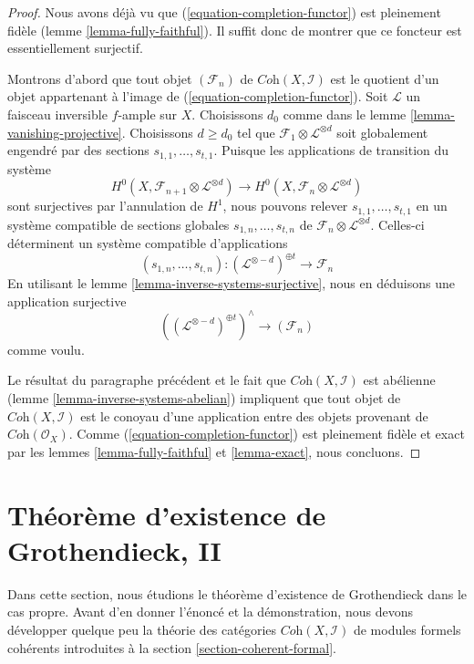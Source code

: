 \begin{proof}
Nous avons déjà vu que (\ref{equation-completion-functor}) est
pleinement fidèle (lemme \ref{lemma-fully-faithful}). Il suffit donc
de montrer que ce foncteur est essentiellement surjectif.

\medskip\noindent
Montrons d'abord que tout objet $(\mathcal{F}_n)$ de
$\textit{Coh}(X, \mathcal{I})$ est le quotient d'un objet
appartenant à l'image de (\ref{equation-completion-functor}).
Soit $\mathcal{L}$ un faisceau inversible $f$-ample sur $X$.
Choisissons $d_0$ comme dans le lemme \ref{lemma-vanishing-projective}.
Choisissons $d \geq d_0$ tel que
$\mathcal{F}_1 \otimes \mathcal{L}^{\otimes d}$
soit globalement engendré par des sections $s_{1, 1}, \ldots, s_{t, 1}$.
Puisque les applications de transition du système
$$
H^0(X, \mathcal{F}_{n + 1} \otimes \mathcal{L}^{\otimes d})
\longrightarrow
H^0(X, \mathcal{F}_n \otimes \mathcal{L}^{\otimes d})
$$
sont surjectives par l'annulation de $H^1$, nous pouvons relever
$s_{1, 1}, \ldots, s_{t, 1}$ en un système compatible de sections globales
$s_{1, n}, \ldots, s_{t, n}$ de
$\mathcal{F}_n \otimes \mathcal{L}^{\otimes d}$.
Celles-ci déterminent un système compatible d'applications
$$
(s_{1, n}, \ldots, s_{t, n}) :
(\mathcal{L}^{\otimes -d})^{\oplus t} \longrightarrow \mathcal{F}_n
$$
En utilisant le lemme \ref{lemma-inverse-systems-surjective},
nous en déduisons une application surjective
$$
\left((\mathcal{L}^{\otimes -d})^{\oplus t}\right)^\wedge
\longrightarrow
(\mathcal{F}_n)
$$
comme voulu.

\medskip\noindent
Le résultat du paragraphe précédent et le fait que
$\textit{Coh}(X, \mathcal{I})$ est abélienne
(lemme \ref{lemma-inverse-systems-abelian})
impliquent que
tout objet de $\textit{Coh}(X, \mathcal{I})$ est le conoyau
d'une application entre des objets provenant de $\textit{Coh}(\mathcal{O}_X)$.
Comme (\ref{equation-completion-functor}) est pleinement fidèle et exact par les
lemmes \ref{lemma-fully-faithful} et \ref{lemma-exact},
nous concluons.
\end{proof}








\section{Théorème d'existence de Grothendieck, II}
\label{section-existence-proper}

\noindent
Dans cette section, nous étudions le théorème d'existence de Grothendieck dans le
cas propre. Avant d'en donner l'énoncé et la démonstration, nous devons développer quelque
peu la théorie des catégories $\textit{Coh}(X, \mathcal{I})$
de modules formels cohérents introduites
à la section \ref{section-coherent-formal}.

